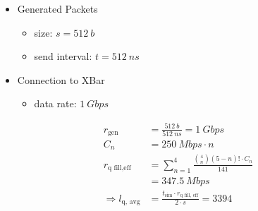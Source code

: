 \documentclass[]{scrartcl}
\begin{document}
        \begin{itemize}
            \item Generated Packets
                \begin{itemize}
                    \item size: $ s = \SI{512}{b}$
                    \item send interval: $ t = \SI{512}{ns}$
                \end{itemize}
            \item Connection to XBar
                \begin{itemize}
                    \item data rate: $\SI{1}{Gbps}$
                \end{itemize}
        \end{itemize}

        \begin{align}
            r_\text{gen} &= \frac{\SI{512}{b}}{\SI{512}{ns}} = \SI{1}{Gbps}\\
            C_n &= \SI{250}{Mbps}\cdot n\\
            r_\text{q fill,eff} &= \sum_{n=1}^4 \frac{\binom{4}{n}\left( 5-n \right)! \cdot C_n }{141}\\
                                &= \SI{347.5}{Mbps}\\
            \Rightarrow l_\text{q, avg} &= \frac{t_\text{sim}\cdot r_\text{q fill, eff}}{2\cdot s} = 3394
        \end{align}
\end{document}
